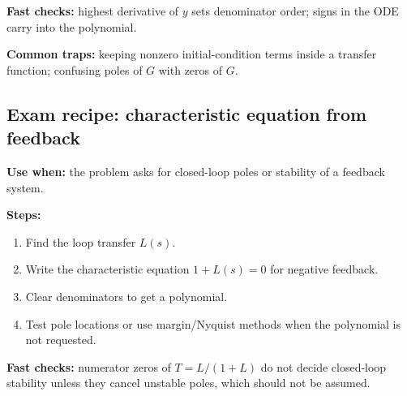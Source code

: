 \textbf{Fast checks:} highest derivative of \(y\) sets denominator order; signs in the ODE carry into the polynomial.

\textbf{Common traps:} keeping nonzero initial-condition terms inside a transfer function; confusing poles of \(G\) with zeros of \(G\).

\subsection{Exam recipe: characteristic equation from feedback}

\textbf{Use when:} the problem asks for closed-loop poles or stability of a feedback system.

\textbf{Steps:}
\begin{enumerate}
\item Find the loop transfer \(L(s)\).
\item Write the characteristic equation \(1+L(s)=0\) for negative feedback.
\item Clear denominators to get a polynomial.
\item Test pole locations or use margin/Nyquist methods when the polynomial is not requested.
\end{enumerate}

\textbf{Fast checks:} numerator zeros of \(T=L/(1+L)\) do not decide closed-loop stability unless they cancel unstable poles, which should not be assumed.

